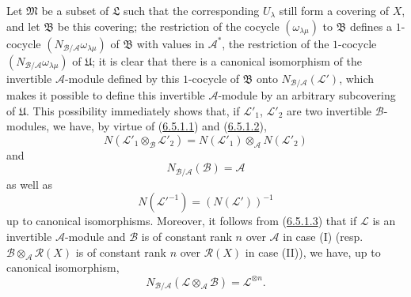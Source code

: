 \begin{env}[6.5.2]
Let $\mathfrak{M}$ be a subset of $\mathfrak{L}$ such that the corresponding
$U_\lambda$ still form a covering of $X$, and let $\mathfrak{B}$ be this
covering; the restriction of the cocycle $(\omega_{\lambda\mu})$ to
$\mathfrak{B}$ defines a $1$-cocycle
$(N_{\mathcal{B}/\mathcal{A}}\omega_{\lambda\mu})$ of $\mathfrak{B}$ with
values in $\mathcal{A}^*$, the restriction of the $1$-cocycle
$(N_{\mathcal{B}/\mathcal{A}}\omega_{\lambda\mu})$ of $\mathfrak{U}$; it is
clear that there is a canonical isomorphism of the invertible
$\mathcal{A}$-module defined by this $1$-cocycle of $\mathfrak{B}$ onto
$N_{\mathcal{B}/\mathcal{A}}(\mathcal{L}')$, which makes it possible to
define this invertible $\mathcal{A}$-module by an arbitrary subcovering of
$\mathfrak{U}$. This possibility immediately shows that, if
$\mathcal{L}'_1$, $\mathcal{L}'_2$ are two invertible $\mathcal{B}$-modules,
we have, by virtue of (\hyperref[II.6.5.1.1]{6.5.1.1}) and
(\hyperref[II.6.5.1.2]{6.5.1.2}),
\[
\label{II.6.5.2.1}
N(\mathcal{L}'_1\otimes_{\mathcal{B}}\mathcal{L}'_2)
=N(\mathcal{L}'_1)\otimes_{\mathcal{A}}N(\mathcal{L}'_2)
\tag{6.5.2.1}
\]
and
\[
\label{II.6.5.2.2}
N_{\mathcal{B}/\mathcal{A}}(\mathcal{B})=\mathcal{A}
\tag{6.5.2.2}
\]
as well as
\[
\label{II.6.5.2.3}
N(\mathcal{L}'^{-1})=(N(\mathcal{L}'))^{-1}
\tag{6.5.2.3}
\]
up to canonical isomorphisms. Moreover, it follows from
(\hyperref[II.6.5.1.3]{6.5.1.3}) that if $\mathcal{L}$ is an invertible
$\mathcal{A}$-module and $\mathcal{B}$ is of constant rank $n$ over
$\mathcal{A}$ in case (I) (resp.
$\mathcal{B}\otimes_{\mathcal{A}}\mathcal{R}(X)$ is of constant rank $n$
over $\mathcal{R}(X)$ in case (II)), we have, up to canonical isomorphism,
\[
\label{II.6.5.2.4}
N_{\mathcal{B}/\mathcal{A}}(\mathcal{L}\otimes_{\mathcal{A}}\mathcal{B})
=\mathcal{L}^{\otimes n}.
\tag{6.5.2.4}
\]
\end{env}

